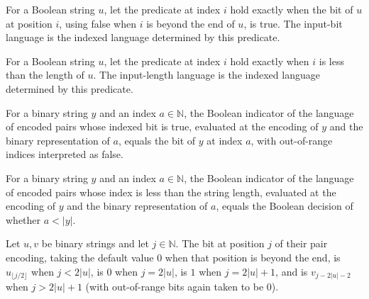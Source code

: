 \begin{definition}
\label{Complexity.inputBitLang}
\leanok
{}
For a Boolean string $u$, let the predicate at index $i$ hold exactly when the bit of
$u$ at position $i$, using false when $i$ is beyond the end of $u$, is true. The
input-bit language is the indexed language determined by this predicate.
\end{definition}

\begin{definition}
\label{Complexity.inputLenLang}
\leanok
{}
For a Boolean string $u$, let the predicate at index $i$ hold exactly when $i$ is less
than the length of $u$. The input-length language is the indexed language determined by
this predicate.
\end{definition}

\begin{theorem}
\label{Complexity.indicator_inputBitLang}
\leanok
{}
For a binary string $y$ and an index $a\in\mathbb N$, the Boolean indicator of the
language of encoded pairs whose indexed bit is true, evaluated at the encoding of $y$
and the binary representation of $a$, equals the bit of $y$ at index $a$, with
out-of-range indices interpreted as false.
\end{theorem}

\begin{theorem}
\label{Complexity.indicator_inputLenLang}
\leanok
{}
For a binary string $y$ and an index $a\in\mathbb N$, the Boolean indicator of the
language of encoded pairs whose index is less than the string length, evaluated at the
encoding of $y$ and the binary representation of $a$, equals the Boolean decision of
whether $a<|y|$.
\end{theorem}

\begin{theorem}
\label{Complexity.pairEncode_getD}
\leanok
{}
Let $u,v$ be binary strings and let $j\in\mathbb{N}$. The bit at position $j$ of their
pair encoding, taking the default value $0$ when that position is beyond the end, is
$u_{\lfloor j/2\rfloor}$ when $j<2|u|$, is $0$ when $j=2|u|$, is $1$ when $j=2|u|+1$,
and is $v_{j-2|u|-2}$ when $j>2|u|+1$ (with out-of-range bits again taken to be $0$).
\end{theorem}

